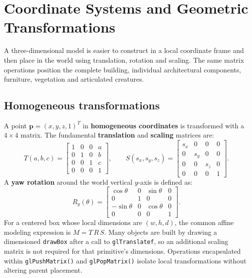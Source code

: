 \documentclass[10pt,a4paper,oneside]{article}
\begin{document}
\section{Coordinate Systems and Geometric Transformations}
A three-dimensional model is easier to construct in a local coordinate frame and then place in the world using translation, rotation and scaling. The same matrix operations position the complete building, individual architectural components, furniture, vegetation and articulated creatures.

\subsection{Homogeneous transformations}
A point $\mathbf p=(x,y,z,1)^T$ in \textbf{homogeneous coordinates} is transformed with a $4\times4$ matrix. The fundamental \textbf{translation} and \textbf{scaling} matrices are:
\begin{equation}T(a,b,c)=\begin{bmatrix}1&0&0&a\\0&1&0&b\\0&0&1&c\\0&0&0&1\end{bmatrix},\qquad S(s_x,s_y,s_z)=\begin{bmatrix}s_x&0&0&0\\0&s_y&0&0\\0&0&s_z&0\\0&0&0&1\end{bmatrix}.\end{equation}
A \textbf{yaw rotation} around the world vertical $y$-axis is defined as:
\begin{equation}R_y(\theta)=\begin{bmatrix}\cos\theta&0&\sin\theta&0\\0&1&0&0\\-\sin\theta&0&\cos\theta&0\\0&0&0&1\end{bmatrix}.\end{equation}
For a centered box whose local dimensions are $(w,h,d)$, the common affine modeling expression is $M=T\,R\,S$. Many objects are built by drawing a dimensioned \texttt{drawBox} after a call to \texttt{glTranslatef}, so an additional scaling matrix is not required for that primitive's dimensions. Operations encapsulated within \texttt{glPushMatrix()} and \texttt{glPopMatrix()} isolate local transformations without altering parent placement.
\end{document}
